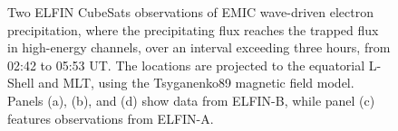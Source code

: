 \documentclass[
  letterpaper,
  DIV=11,
  numbers=noendperiod]{scrartcl}
\begin{document}
\begin{figure}


\caption{\label{fig-elfin}Two ELFIN CubeSats observations of EMIC wave-driven electron precipitation, where the precipitating flux reaches the trapped flux in high-energy channels, over an interval exceeding three hours, from 02:42 to 05:53 UT. The locations are projected to the equatorial L-Shell and MLT, using the Tsyganenko89 magnetic field model. Panels (a), (b), and (d) show data from ELFIN-B, while panel (c) features observations from ELFIN-A.}

\end{figure}%
\end{document}
